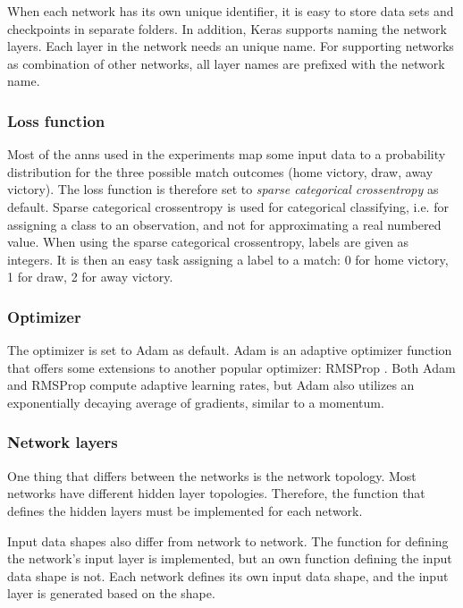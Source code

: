 When each network has its own unique identifier, it is easy to store data sets and checkpoints in separate folders. In addition, Keras supports naming the network layers. Each layer in the network needs an unique name. For supporting networks as combination of other networks, all layer names are prefixed with the network name.

\subsubsection{Loss function}

Most of the \glspl{ann} used in the experiments map some input data to a probability distribution for the three possible match outcomes (home victory, draw, away victory). The loss function is therefore set to \textit{sparse categorical crossentropy} as default. Sparse categorical crossentropy is used for categorical classifying, i.e. for assigning a class to an observation, and not for approximating a real numbered value. When using the sparse categorical crossentropy, labels are given as integers. It is then an easy task assigning a label to a match: 0 for home victory, 1 for draw, 2 for away victory.

\subsubsection{Optimizer}

The optimizer is set to Adam \citep{bib:kingma2014adam} as default. Adam is an adaptive optimizer function that offers some extensions to another popular optimizer: RMSProp \citep{bib:hinton2012neural}. Both Adam and RMSProp compute adaptive learning rates, but Adam also utilizes an exponentially decaying average of gradients, similar to a momentum.

\subsubsection{Network layers}

One thing that differs between the networks is the network topology. Most networks have different hidden layer topologies. Therefore, the function that defines the hidden layers must be implemented for each network.

Input data shapes also differ from network to network. The function for defining the network's input layer is implemented, but an own function defining the input data shape is not. Each network defines its own input data shape, and the input layer is generated based on the shape.

